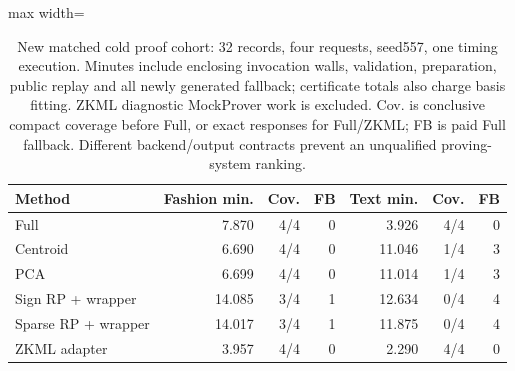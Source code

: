 \begin{table}[tbp]
\centering
\small
\caption{New matched cold proof cohort: 32 records, four requests, seed557, one timing execution. Minutes include enclosing invocation walls, validation, preparation, public replay and all newly generated fallback; certificate totals also charge basis fitting. ZKML diagnostic MockProver work is excluded. Cov. is conclusive compact coverage before Full, or exact responses for Full/ZKML; FB is paid Full fallback. Different backend/output contracts prevent an unqualified proving-system ranking.}
\label{tab:latest-cold}
\begin{adjustbox}{max width=\textwidth}
\begin{tabular*}{.98\textwidth}{@{\extracolsep{\fill}}lrrrrrr@{}}
\toprule
Method & Fashion min. & Cov. & FB & Text min. & Cov. & FB\\
\midrule
Full & 7.870 & 4/4 & 0 & 3.926 & 4/4 & 0\\
Centroid & 6.690 & 4/4 & 0 & 11.046 & 1/4 & 3\\
PCA & 6.699 & 4/4 & 0 & 11.014 & 1/4 & 3\\
Sign RP + wrapper & 14.085 & 3/4 & 1 & 12.634 & 0/4 & 4\\
Sparse RP + wrapper & 14.017 & 3/4 & 1 & 11.875 & 0/4 & 4\\
ZKML adapter & 3.957 & 4/4 & 0 & 2.290 & 4/4 & 0\\
\bottomrule
\end{tabular*}
\end{adjustbox}
\end{table}
